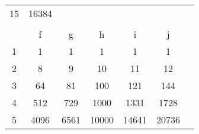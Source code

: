 \documentclass[review,12pt]{elsarticle}
\begin{document}
\begin{table}[htbp!]
\begin{tabular}{ccccccc}
\multicolumn{1}{|c|}{15} & \multicolumn{1}{c|}{16384} & \multicolumn{1}{c|}{\cellcolor[HTML]{9B9B9B}} & \multicolumn{1}{c|}{\cellcolor[HTML]{9B9B9B}} & \multicolumn{1}{c|}{\cellcolor[HTML]{9B9B9B}} & \multicolumn{1}{c|}{\cellcolor[HTML]{9B9B9B}} &                            \\ \cline{1-6}
                         &                            &                                               &                                               &                                               &                                               &                            \\
                         & f                          & g                                             & h                                             & i                                             & j                                             &                            \\ \cline{1-6}
\multicolumn{1}{|c|}{1}  & \multicolumn{1}{c|}{1}     & \multicolumn{1}{c|}{1}                        & \multicolumn{1}{c|}{1}                        & \multicolumn{1}{c|}{1}                        & \multicolumn{1}{c|}{1}                        &                            \\ \cline{1-6}
\multicolumn{1}{|c|}{2}  & \multicolumn{1}{c|}{8}     & \multicolumn{1}{c|}{9}                        & \multicolumn{1}{c|}{10}                       & \multicolumn{1}{c|}{11}                       & \multicolumn{1}{c|}{12}                       &                            \\ \cline{1-6}
\multicolumn{1}{|c|}{3}  & \multicolumn{1}{c|}{64}    & \multicolumn{1}{c|}{81}                       & \multicolumn{1}{c|}{100}                      & \multicolumn{1}{c|}{121}                      & \multicolumn{1}{c|}{144}                      &                            \\ \cline{1-6}
\multicolumn{1}{|c|}{4}  & \multicolumn{1}{c|}{512}   & \multicolumn{1}{c|}{729}                      & \multicolumn{1}{c|}{1000}                     & \multicolumn{1}{c|}{1331}                     & \multicolumn{1}{c|}{1728}                     &                            \\ \cline{1-6}
\multicolumn{1}{|c|}{5}  & \multicolumn{1}{c|}{4096}  & \multicolumn{1}{c|}{6561}                     & \multicolumn{1}{c|}{10000}                    & \multicolumn{1}{c|}{14641}                    & \multicolumn{1}{c|}{20736}                    &                            \\ \cline{1-6}

\end{tabular}
\end{table}
\end{document}
